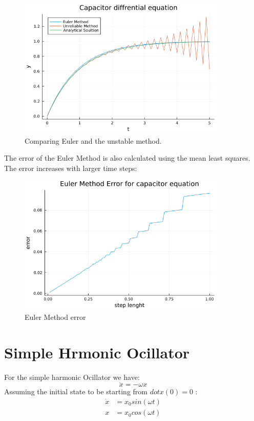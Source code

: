 \documentclass[12pt,a4paper]{article}
\begin{document}
			
			\begin{figure}[H]
				\centering
				\includegraphics[width=10cm]{unstable.png}
				\caption{Comparing Euler and the unstable method. }
			\end{figure}
	The error of the Euler Method is also calculated using the mean least squares. The error increases with larger time steps:
	\begin{figure}[H]
		\centering
		\includegraphics[width=10cm]{error.png}
		\caption{Euler Method error}
	\end{figure}

			

	\section{Simple Hrmonic Ocillator}		
			For the simple harmonic Ocillator we have:
			\begin{equation*}
				\ddot{x} = -\omega x 
			\end{equation*}
			Assuming the initial state to be starting from $dot{x}(0)=0$ : 
			\begin{align*}
				\dot{x} &= x_0 sin(\omega t) \\
				x &=  x_0 cos(\omega t)
			\end{align*}
\end{document}
